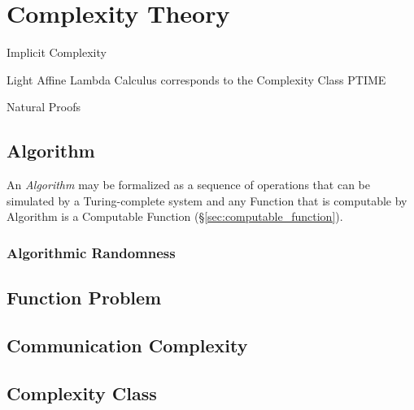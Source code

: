 \section{Complexity Theory}\label{sec:complexity_theory}

Implicit Complexity

Light Affine Lambda Calculus corresponds to the Complexity Class PTIME

Natural Proofs %



\subsection{Algorithm}\label{sec:algorithm}

An \emph{Algorithm} may be formalized as a sequence of operations that
can be simulated by a Turing-complete system and any Function that is
computable by Algorithm is a Computable Function
(\S\ref{sec:computable_function}).



\subsubsection{Algorithmic Randomness}\label{sec:algorithmic_randomness}



\subsection{Function Problem}\label{sec:function_problem}

\subsection{Communication Complexity}\label{sec:communication_complexity}

\subsection{Complexity Class}\label{sec:complexity_class}

